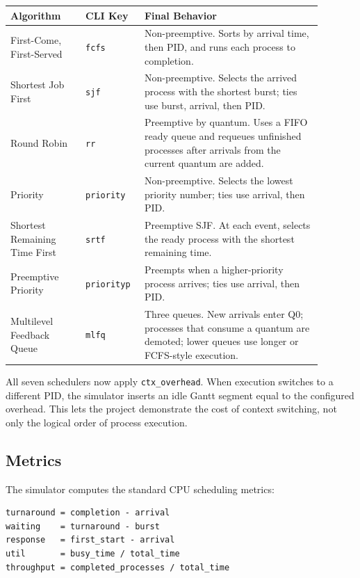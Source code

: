 \documentclass[11pt]{article}
\begin{document}
\begin{longtable}{p{0.22\linewidth}p{0.15\linewidth}p{0.52\linewidth}}
\toprule
\textbf{Algorithm} & \textbf{CLI Key} & \textbf{Final Behavior} \\
\midrule
First-Come, First-Served & \texttt{fcfs} & Non-preemptive. Sorts by arrival
time, then PID, and runs each process to completion. \\
Shortest Job First & \texttt{sjf} & Non-preemptive. Selects the arrived
process with the shortest burst; ties use burst, arrival, then PID. \\
Round Robin & \texttt{rr} & Preemptive by quantum. Uses a FIFO ready queue and
requeues unfinished processes after arrivals from the current quantum are
added. \\
Priority & \texttt{priority} & Non-preemptive. Selects the lowest priority
number; ties use arrival, then PID. \\
Shortest Remaining Time First & \texttt{srtf} & Preemptive SJF. At each event,
selects the ready process with the shortest remaining time. \\
Preemptive Priority & \texttt{priorityp} & Preempts when a higher-priority
process arrives; ties use arrival, then PID. \\
Multilevel Feedback Queue & \texttt{mlfq} & Three queues. New arrivals enter
Q0; processes that consume a quantum are demoted; lower queues use longer or
FCFS-style execution. \\
\bottomrule
\end{longtable}

All seven schedulers now apply \texttt{ctx\_overhead}. When execution switches
to a different PID, the simulator inserts an idle Gantt segment equal to the
configured overhead. This lets the project demonstrate the cost of context
switching, not only the logical order of process execution.

\subsection{Metrics}

The simulator computes the standard CPU scheduling metrics:

\begin{lstlisting}[style=code]
turnaround = completion - arrival
waiting    = turnaround - burst
response   = first_start - arrival
util       = busy_time / total_time
throughput = completed_processes / total_time
\end{lstlisting}
\end{document}
